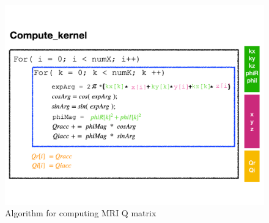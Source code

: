 \begin{figure}[t]
\centering
\captionsetup{justification=centering, format=hang}
\includegraphics[width=0.85\columnwidth]{figures/algorithm}
\caption{Algorithm for computing MRI Q matrix~\cite{stone2008accelerating}}
\label{fig-1}
\end{figure}
